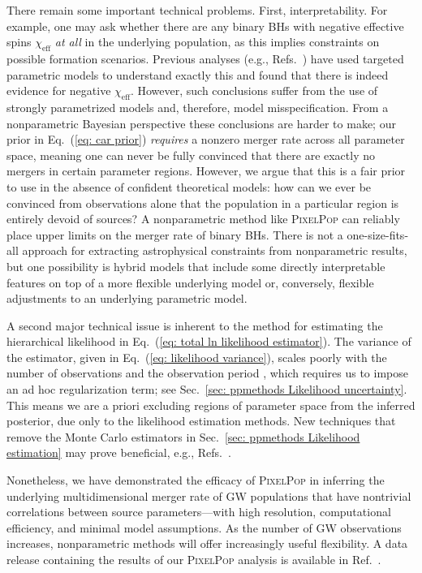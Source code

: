 \begin{refsection}
There remain some important technical problems. First, interpretability. For example, one may ask whether there are any binary BHs with negative effective spins $\chi_\mathrm{eff}$ \textit{at all} in the underlying population, as this implies constraints on possible formation scenarios. Previous analyses (e.g., Refs.~\cite{KAGRA:2021duu, Roulet:2021hcu}) have used targeted parametric models to understand exactly this and found that there is indeed evidence for negative $\chi_\mathrm{eff}$. However, such conclusions suffer from the use of strongly parametrized models and, therefore, model misspecification. From a nonparametric Bayesian perspective these conclusions are harder to make; our prior in Eq.~(\ref{eq: car prior}) \textit{requires} a nonzero merger rate across all parameter space, meaning one can never be fully convinced that there are exactly no mergers in certain parameter regions. However, we argue that this is a fair prior to use in the absence of confident theoretical models: how can we ever be convinced from observations alone that the population in a particular region is entirely devoid of sources? A nonparametric method like \textsc{PixelPop} can reliably place upper limits on the merger rate of binary BHs. There is not a one-size-fits-all approach for extracting astrophysical constraints from nonparametric results, but one possibility is hybrid models \cite{Edelman:2021zkw, Godfrey:2023oxb} that include some directly interpretable features on top of a more flexible underlying model or, conversely, flexible adjustments to an underlying parametric model.

A second major technical issue is inherent to the method for estimating the hierarchical likelihood in Eq.~(\ref{eq: total ln likelihood estimator}). The variance of the estimator, given in Eq.~(\ref{eq: likelihood variance}), scales poorly with the number of observations and the observation period \cite{Talbot:2023pex}, which requires us to impose an ad hoc regularization term; see Sec.~\ref{sec: ppmethods Likelihood uncertainty}. This means we are a priori excluding regions of parameter space from the inferred posterior, due only to the likelihood estimation methods. New techniques that remove the Monte Carlo estimators in Sec.~\ref{sec: ppmethods Likelihood estimation} may prove beneficial, e.g., Refs.~\cite{Talbot:2020oeu, Leyde:2023iof, Gerosa:2024isl, Mancarella:2024qle}.

Nonetheless, we have demonstrated the efficacy of \textsc{PixelPop} in inferring the underlying multidimensional merger rate of GW populations that have nontrivial correlations between source parameters---with high resolution, computational efficiency, and minimal model assumptions. As the number of GW observations increases, nonparametric methods will offer increasingly useful flexibility. A data release containing the results of our \textsc{PixelPop} analysis is available in Ref.~\cite{heinzel_2024_13176116}.


\end{refsection}
